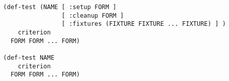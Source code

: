 \begin{verbatim}
  (def-test (NAME [ :setup FORM ]
                  [ :cleanup FORM ]
                  [ :fixtures (FIXTURE FIXTURE ... FIXTURE) ] )
      criterion
    FORM FORM ... FORM)

  (def-test NAME
      criterion
    FORM FORM ... FORM)
\end{verbatim}
